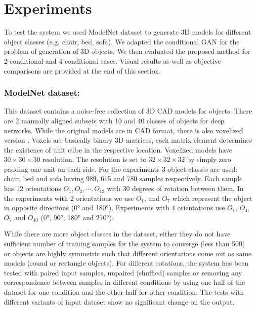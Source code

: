 \documentclass[runningheads]{llncs}
\begin{document}
\section{Experiments}
\label{sect:expert}
To test the system we used ModelNet \cite{wu20153d} dataset to generate 3D models for different object classes (e.g. chair, bed, sofa). We adapted the conditional GAN for the problem of generation of 3D objects. We then evaluated the proposed method for 2-conditional and 4-conditional cases. Visual results as well as objective comparisons are provided at the end of this section.

\subsubsection{ModelNet dataset:} This dataset contains a noise-free collection of 3D CAD models for objects. There are 2 manually aligned subsets with 10 and 40 classes of objects for deep networks. While the original models are in CAD format, there is also voxelized version \cite{wu20153d}. Voxels are basically binary 3D matrices, each matrix element determines the existence of unit cube in the respective location. Voxelized models have $30 \times 30 \times 30$ resolution. The resolution is set to $32 \times 32 \times 32$ by simply zero padding one unit on each side. For the experiments 3 object classes are used: chair, bed and sofa having 989, 615 and 780 samples respectively. Each sample has 12 orientations $O_1,O_2,\dotsb,O_{12}$ with 30 degrees of rotation between them. In the experiments with 2 orientations we use $O_1$, and $O_7$ which represent the object in opposite directions (\ang{0} and \ang{180}). Experiments with 4 orientations use $O_1$, $O_4$, $O_7$ and $O_{10}$ (\ang{0}, \ang{90}, \ang{180} and \ang{270}).

While there are more object classes in the dataset, either they do not have sufficient number of training samples for the system to converge (less than 500) or objects are highly symmetric such that different orientations come out as same models (round or rectangle objects). For different rotations, the system has been tested with paired input samples, unpaired (shuffled) samples or removing any correspondence between samples in different conditions by using one half of the dataset for one condition and the other half for other condition. The tests with different variants of input dataset show no significant change on the output. 
\end{document}
